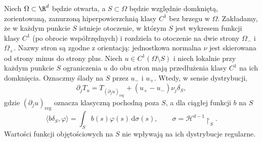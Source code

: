 \begin{twierdzenie}
\label{thm:pde7-jump}
Niech $\Omega\subset\R^d$ będzie otwarta, a
$S\subset\Omega$ będzie względnie domkniętą,
zorientowaną, zanurzoną hiperpowierzchnią klasy $C^1$
bez brzegu w $\Omega$. Zakładamy, że w każdym
punkcie $S$ istnieje otoczenie, w którym $S$ jest
wykresem funkcji klasy $C^1$ (po obrocie współrzędnych)
i rozdziela to otoczenie na dwie strony $\Omega_-$
i $\Omega_+$. Nazwy stron są zgodne z orientacją:
jednostkowa normalna $\nu$ jest skierowana
od strony minus do strony plus.
Niech $u\in C^1(\Omega\setminus S)$ i niech lokalnie
przy każdym punkcie $S$ ograniczenia $u$ do obu stron
mają przedłużenia klasy $C^1$ na ich domknięcia.
Oznaczmy ślady na $S$ przez $u_-$ i $u_+$.
Wtedy, w sensie dystrybucji,
\begin{equation}\label{eq:pde7-jump}
 \partial_jT_u=T_{(\partial_ju)_{\mathrm{reg}}}
 +(u_+-u_-)\nu_j\delta_S,
\end{equation}
gdzie $(\partial_ju)_{\mathrm{reg}}$ oznacza klasyczną
pochodną poza $S$, a dla ciągłej funkcji $b$ na $S$
\[
 \langle b\delta_S,\varphi\rangle
 =\int_S b(s)\varphi(s)\,\mathrm d\sigma(s),
 \qquad \sigma=\mathcal H^{d-1}\!\restriction_S.
\]
Wartości funkcji objętościowych na $S$ nie wpływają
na ich dystrybucje regularne.
\end{twierdzenie}
